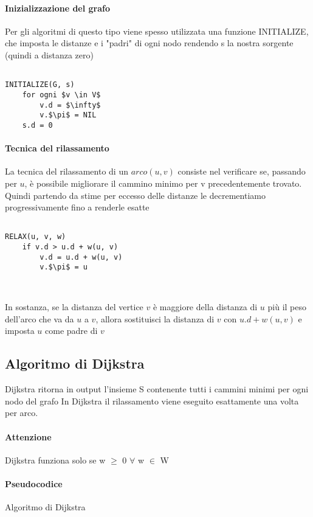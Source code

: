 \documentclass[12pt, a4paper, openany]{book}
\begin{document}
\paragraph*{Inizializzazione del grafo}
Per gli algoritmi di questo tipo viene spesso utilizzata una funzione INITIALIZE, che imposta
le distanze e i "padri" di ogni nodo rendendo s la nostra sorgente (quindi a distanza zero)

\begin{lstlisting}

INITIALIZE(G, s)
    for ogni $v \in V$
        v.d = $\infty$
        v.$\pi$ = NIL
    s.d = 0
\end{lstlisting}

\paragraph{Tecnica del rilassamento}
La tecnica del rilassamento di un $arco (u,v)$ consiste nel verificare se, passando per $u$, è possibile migliorare il cammino minimo
per v precedentemente trovato. Quindi partendo da stime per eccesso delle distanze le decrementiamo progressivamente
fino a renderle esatte

\begin{lstlisting}

RELAX(u, v, w)
    if v.d > u.d + w(u, v)
        v.d = u.d + w(u, v)
        v.$\pi$ = u
    
    
\end{lstlisting}

In sostanza, se la distanza del vertice $v$ è maggiore della distanza di $u$ più il peso
dell'arco che va da $u$ a $v$, allora sostituisci la distanza di $v$ con $u.d + w(u, v)$
e imposta $u$ come padre di $v$

\subsection{Algoritmo di Dijkstra}
Dijkstra ritorna in output l'insieme S contenente tutti i cammini minimi per ogni nodo del grafo
In Dijkstra il rilassamento viene eseguito esattamente una volta per arco.

\paragraph{Attenzione}
Dijkstra funziona solo se w $\geq$  0 $\forall$ w $\in$ W

\paragraph{Pseudocodice} Algoritmo di Dijkstra
\end{document}
